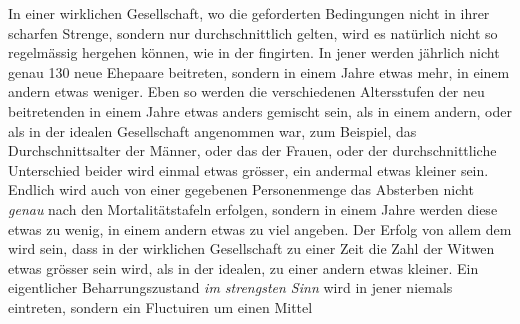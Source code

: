 In einer wirklichen Gesellschaft, wo die geforderten Bedingungen nicht in ihrer scharfen Strenge, sondern nur durchschnittlich gelten, wird es natürlich nicht so regelmässig hergehen können, wie in der fingirten. In jener werden jährlich nicht genau 130 neue Ehepaare beitreten, sondern in einem Jahre etwas mehr, in einem andern etwas weniger. Eben so werden die verschiedenen Altersstufen der neu beitretenden in einem Jahre etwas anders gemischt sein, als in einem andern, oder als in der idealen Gesellschaft angenommen war, zum Beispiel, das Durchschnittsalter der Männer, oder das der Frauen, oder der durchschnittliche Unterschied beider wird einmal etwas grösser, ein andermal etwas kleiner sein. Endlich wird auch von einer gegebenen Personenmenge das Absterben nicht \textit{genau} nach den Mortalitätstafeln erfolgen, sondern in einem Jahre werden diese etwas zu wenig, in einem andern etwas zu viel angeben. Der Erfolg von allem dem wird sein, dass in der wirklichen Gesellschaft zu einer Zeit die Zahl der Witwen etwas grösser sein wird, als in der idealen, zu einer andern etwas kleiner. Ein eigentlicher Beharrungszustand \textit{im strengsten Sinn} wird in jener niemals eintreten, sondern ein Fluctuiren um einen Mittel%
